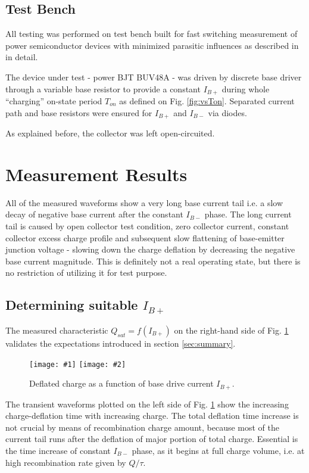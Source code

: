 \documentclass{eeict}
\newcommand{\myfigdual}[4]
{
    \begin{figure}[!ht]
	\centering
	\texttt{[image: \#1]}
	\texttt{[image: \#2]}
	\caption{#3}
	#4
    \end{figure}
}
\begin{document}
\subsection{Test Bench}
All testing was performed on test bench built for fast switching measurement of power semiconductor devices with minimized parasitic influences as described in \cite{prochazka} in detail.

The device under test - power BJT BUV48A - was driven by discrete base driver through a variable base resistor to provide a constant $I_{B+}$ during whole ``charging'' on-state period $T_{on}$ as defined on Fig. \ref{fig:vsTon}. Separated current path and base resistors were ensured for $I_{B+}$ and $I_{B-}$ via diodes.

As explained before, the collector was left open-circuited.


\section{Measurement Results} \label{sec:results}

All of the measured waveforms show a very long base current tail i.e. a slow decay of negative base current after the constant $I_{B-}$ phase. The long current tail is caused by open collector test condition, zero collector current, constant collector excess charge profile and subsequent slow flattening of base-emitter junction voltage - slowing down the charge deflation by decreasing the negative base current magnitude.
This is definitely not a real operating state, but there is no restriction of utilizing it for test purpose. 


\subsection{Determining suitable $I_{B+}$} \label{sec:mer_vsIbpos}

The measured characteristic $Q_{sat} = f(I_{B+})$ on the right-hand side of Fig. \ref{fig:vsIbpos} validates the expectations introduced in section \ref{sec:summary}.

\myfigdual{priebeh_vsIbpos}{QvsIbpos}{Deflated charge as a function of base drive current $I_{B+}$.}{\label{fig:vsIbpos}}

The transient waveforms plotted on the left side of Fig. \ref{fig:vsIbpos} show the increasing charge-deflation time with increasing charge. The total deflation time increase is not crucial by means of recombination charge amount, because most of the current tail runs after the deflation of major portion of total charge. Essential is the time increase of constant $I_{B-}$ phase, as it begins at full charge volume, i.e. at high recombination rate given by $Q/\tau$.
\end{document}
